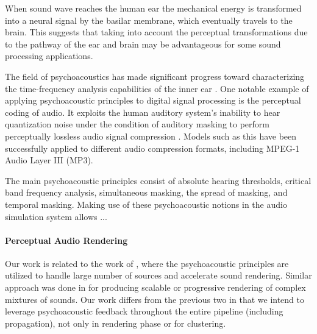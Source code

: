 When sound wave reaches the human ear the mechanical energy is transformed into a neural signal by the basilar membrane, which eventually travels to the brain. This suggests that taking into account the perceptual transformations due to the pathway of the ear and brain may be advantageous for some sound processing applications.

The field of psychoacoustics has made significant progress toward characterizing the time-frequency analysis capabilities of the inner ear \cite{painter2000perceptual}. One notable example of applying psychoacoustic principles to digital signal processing is the perceptual coding of audio. It exploits the human auditory system's inability to hear quantization noise under the condition of auditory masking \cite{pan1995tutorial} to perform perceptually lossless audio signal compression \cite{ambikairajah1997auditory}. Models such as this have been successfully applied to different audio compression formats, including MPEG-1 Audio Layer III (MP3).

The main psychoacoustic principles consist of absolute hearing thresholds, critical band frequency analysis, simultaneous masking, the spread of masking, and temporal masking. Making use of these psychoacoustic notions in the audio simulation system allows ...  



\paragraph{Perceptual Audio Rendering} 

Our work is related to the work of \cite{tsingos2004perceptual}, where the psychoacoustic principles are utilized to handle large number of sources and accelerate sound rendering.
Similar approach was done in \cite{moeck2007progressive} for producing scalable or progressive rendering of complex mixtures of sounds.
Our work differs from the previous two in that we intend to leverage psychoacoustic feedback throughout the entire pipeline (including propagation), not only in rendering phase or for clustering.


